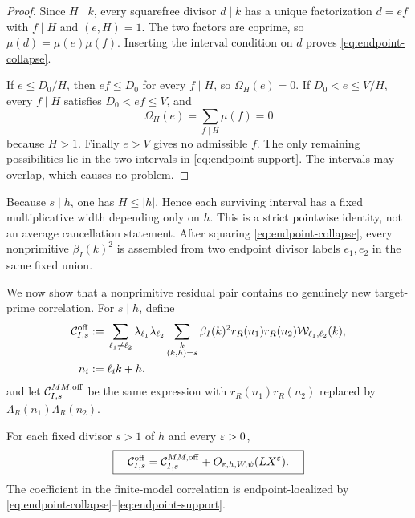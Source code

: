 \begin{proof}
Since $H\mid k$, every squarefree divisor $d\mid k$ has a unique
factorization $d=ef$ with $f\mid H$ and $(e,H)=1$.  The two factors are
coprime, so $\mu(d)=\mu(e)\mu(f)$.  Inserting the interval condition on
$d$ proves \eqref{eq:endpoint-collapse}.

If $e\le D_0/H$, then $ef\le D_0$ for every $f\mid H$, so
$\Omega_H(e)=0$.  If $D_0<e\le V/H$, every $f\mid H$ satisfies
$D_0<ef\le V$, and
\[
 \Omega_H(e)=\sum_{f\mid H}\mu(f)=0
\]
because $H>1$.  Finally $e>V$ gives no admissible $f$.  The only
remaining possibilities lie in the two intervals in
\eqref{eq:endpoint-support}.  The intervals may overlap, which causes
no problem.
\end{proof}

Because $s\mid h$, one has $H\le|h|$.  Hence each surviving interval
has a fixed multiplicative width depending only on $h$.  This is a
strict pointwise identity, not an average cancellation statement.
After squaring \eqref{eq:endpoint-collapse}, every nonprimitive
$\beta_I(k)^2$ is assembled from two endpoint divisor labels
$e_1,e_2$ in the same fixed union.

We now show that a nonprimitive residual pair contains no genuinely new
target-prime correlation.  For $s\mid h$, define
\begin{align}
 \mathcal C_{I,s}^{\mathrm{off}}
 :={}&\sum_{\ell_1\ne\ell_2}
 \lambda_{\ell_1}\lambda_{\ell_2}
 \sum_{\substack{k\\(k,h)=s}}
 \beta_I(k)^2r_R(n_1)r_R(n_2)
 \mathcal W_{\ell_1,\ell_2}(k),
 \label{eq:sector-residual-correlation}\\
 n_i:={}&\ell_i k+h,
 \notag
\end{align}
and let $\mathcal C_{I,s}^{MM,\mathrm{off}}$ be the same expression with
$r_R(n_1)r_R(n_2)$ replaced by
$\Lambda_R(n_1)\Lambda_R(n_2)$.

\begin{theorem}
\label{thm:nonprimitive-MM}
For each fixed divisor $s>1$ of $h$ and every $\varepsilon>0$,
\begin{equation}
 \boxed{\quad
 \mathcal C_{I,s}^{\mathrm{off}}
 =\mathcal C_{I,s}^{MM,\mathrm{off}}
 +O_{\varepsilon,h,W,\psi}(LX^\varepsilon).
 \quad}
 \label{eq:nonprimitive-MM}
\end{equation}
The coefficient in the finite-model correlation is endpoint-localized
by \eqref{eq:endpoint-collapse}--\eqref{eq:endpoint-support}.
\end{theorem}

